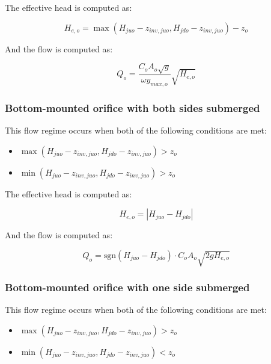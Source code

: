 \documentclass[11pt]{article}
\begin{document}
The effective head is computed as:

\begin{equation}
  H_{e,o} = \max(H_{juo} - z_{inv,juo}, H_{jdo} - z_{inv,juo}) - z_{o}
\end{equation}

And the flow is computed as:

\begin{equation}
 Q_o = \frac{C_o A_o \sqrt{g}}{\omega y_{max,o}} \sqrt{H_{e,o}}
\end{equation}

\subsubsection*{Bottom-mounted orifice with both sides submerged}

This flow regime occurs when both of the following conditions are met:

\begin{itemize}
\item $\max(H_{juo} - z_{inv,juo}, H_{jdo} - z_{inv,juo}) > z_o$
\item $\min(H_{juo} - z_{inv,juo}, H_{jdo} - z_{inv,juo}) > z_o$
\end{itemize}

The effective head is computed as:

\begin{equation}
  H_{e,o} = | H_{juo} - H_{jdo} |
\end{equation}

And the flow is computed as:

\begin{equation}
 Q_o = \text{sgn}(H_{juo} - H_{jdo}) \cdot C_o A_o \sqrt{2 g H_{e,o}} 
\end{equation}

\subsubsection*{Bottom-mounted orifice with one side submerged}

This flow regime occurs when both of the following conditions are met:

\begin{itemize}
\item $\max(H_{juo} - z_{inv,juo}, H_{jdo} - z_{inv,juo}) > z_o$
\item $\min(H_{juo} - z_{inv,juo}, H_{jdo} - z_{inv,juo}) < z_o$
\end{itemize}
\end{document}
